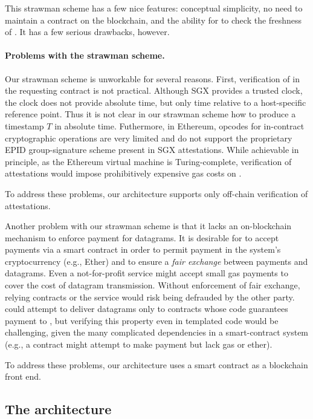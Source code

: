 This strawman scheme has a few nice features: conceptual simplicity, no need to maintain a \tc contract on the blockchain, and the ability for \reqcont to check the freshness of \att. It has a few serious drawbacks, however.

\paragraph{Problems with the strawman scheme.}
Our strawman scheme is unworkable for several reasons. First, verification of \att in the requesting contract \reqcont is not practical. Although SGX provides a 
trusted clock, the clock does not provide absolute time, but only time relative to a host-specific reference point.
Thus it is not clear in our strawman scheme how to produce a timestamp $T$ in absolute time. Futhermore, in Ethereum, opcodes for in-contract cryptographic operations are very limited and do not support the proprietary EPID group-signature scheme present in SGX attestations. While achievable in principle, as the Ethereum virtual machine is Turing-complete, verification of attestations would impose prohibitively expensive gas costs on \reqcont. 

To address these problems, our \tc architecture supports only off-chain verification of attestations.

Another problem with our strawman scheme is that it lacks an on-blockchain mechanism to enforce payment for datagrams. It is desirable for \tc to accept payments via a smart contract in order to permit payment in the system's cryptocurrency (e.g., Ether) and to ensure a {\em fair exchange} between payments and datagrams. Even a not-for-profit \tc service might accept small gas payments to cover the cost of datagram transmission. Without enforcement of fair exchange, relying contracts or the \tc service would risk being defrauded by the other party. \tc could attempt to deliver datagrams only to contracts whose code guarantees payment to \tc, but verifying this property even in templated code would be challenging, given the many complicated dependencies in a smart-contract system (e.g., a contract might attempt to make payment but lack gas or ether). 

To address these problems, our \tc architecture uses a smart contract \tcont as a blockchain front end.

\subsection{The \tc architecture}

